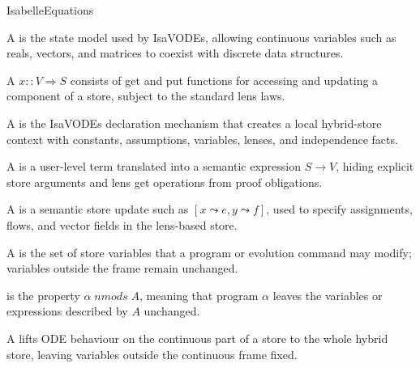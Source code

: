 \documentclass[hidelinks]{article}
\begin{document}
\begin{smodule}[title={IsaVODEs: Interactive Verification of Cyber-Physical Systems at Scale}]{IsabelleEquations}
\begin{sdefinition}[for=HybridStore]
    A  is the state model used by IsaVODEs, allowing continuous variables such as reals, vectors, and matrices to coexist with discrete data structures.
\end{sdefinition}

\begin{sdefinition}[for=Lens]
    A  \(x::V\Rightarrow S\) consists of get and put functions for accessing and updating a component of a store, subject to the standard lens laws.
\end{sdefinition}

\begin{sdefinition}[for=Dataspace]
    A  is the IsaVODEs declaration mechanism that creates a local hybrid-store context with constants, assumptions, variables, lenses, and independence facts.
\end{sdefinition}

\begin{sdefinition}[for=LiftedExpression]
    A  is a user-level term translated into a semantic expression \(S\to V\), hiding explicit store arguments and lens get operations from proof obligations.
\end{sdefinition}

\begin{sdefinition}[for=LensSubstitution]
    A  is a semantic store update such as \([x\leadsto e,y\leadsto f]\), used to specify assignments, flows, and vector fields in the lens-based store.
\end{sdefinition}

\begin{sdefinition}[for=Frame]
    A  is the set of store variables that a program or evolution command may modify; variables outside the frame remain unchanged.
\end{sdefinition}

\begin{sdefinition}[for=NonModification]
     is the property \(\alpha\;nmods\;A\), meaning that program \(\alpha\) leaves the variables or expressions described by \(A\) unchanged.
\end{sdefinition}

\begin{sdefinition}[for=FramedEvolutionCommand]
    A  lifts ODE behaviour on the continuous part of a store to the whole hybrid store, leaving variables outside the continuous frame fixed.
\end{sdefinition}


\end{smodule}
\end{document}
